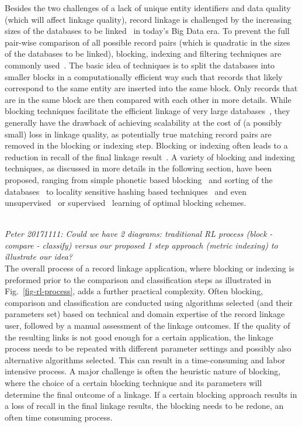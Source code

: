 \documentclass{llncs}
\begin{document}
Besides the two challenges of a lack of unique entity identifiers and
data quality (which will affect linkage quality), record linkage is
challenged by the increasing sizes of the databases to be
linked~\cite{Don15} in today's Big Data era. To prevent the full
pair-wise comparison of all possible record pairs (which is quadratic
in the sizes of the databases to be linked), blocking, indexing and
filtering techniques are commonly used~\cite{Chr12}. The basic idea
of techniques is to split the databases into smaller blocks in a
computationally efficient way such that records that likely correspond
to the same entity are inserted into the same block. Only records that
are in the same block are then compared with each other in more
details. While blocking techniques facilitate the efficient linkage
of very large databases~\cite{Don15}, they generally have the drawback
of achieving scalability at the cost of (a possibly small) loss in
linkage quality, as potentially true matching record pairs are
removed in the blocking or indexing step. Blocking or indexing often
leads to a reduction in recall of the final linkage
result~\cite{Chr12}. A variety of blocking and indexing techniques,
as discussed in more details in the following section, have been
proposed, ranging from simple phonetic based blocking~\cite{Chr12} and
sorting of the databases~\cite{Dra12} to locality sensitive hashing
based techniques~\cite{Kim10} and even unsupervised~\cite{Kej13,Ram15}
or supervised~\cite{Bil06,Mic06} learning of optimal blocking schemes.

~ \\
\emph{Peter 20171111: Could we have 2 diagrams: traditional RL process
(block - compare - classify) versus our proposed 1 step approach
(metric indexing) to illustrate our idea?}
~ \\

The overall process of a record linkage application, where blocking
or indexing is preformed prior to the comparison and classification
steps as illustrated in Fig.~\ref{fig-rl-process}, adds a further
practical complexity. Often blocking, comparison and classification
are conducted using algorithms selected (and their parameters set)
based on technical and domain expertise of the record linkage user,
followed by a manual assessment of the linkage outcomes. If the
quality of the resulting links is not good enough for a certain
application, the linkage process needs to be repeated with different
parameter settings and possibly also alternative algorithms
selected. This can result in a time-consuming and labor intensive
process. A major challenge is often the heuristic nature of blocking,
where the choice of a certain blocking technique and its parameters
will determine the final outcome of a linkage. If a certain blocking
approach results in a loss of recall in the final linkage results,
the blocking needs to be redone, an often time consuming process.
\end{document}
